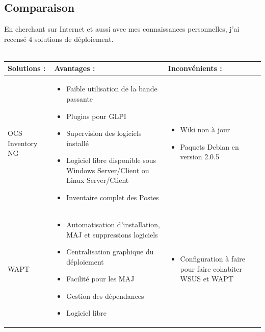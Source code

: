\documentclass[11pt,a4paper,oneside]{article}
\begin{document}
\subsection{Comparaison}
En cherchant sur Internet et aussi avec mes connaissances personnelles, j'ai recensé 4 solutions de déploiement.\\ \\
\begin{tabular}{|p{3.1cm}|p{6.5cm}|p{6.5cm}|}
	\hline
	\centering Solutions : & \centering Avantages : & Inconvénients : \\
	\hline
	\centering OCS Inventory NG  & \begin{itemize}
							\item Faible utilisation de la bande passante 
							\item Plugins pour GLPI							
							\item Supervision des logiciels installé
							\item Logiciel libre disponible sous Windows Server/Client ou Linux Server/Client
							\item Inventaire complet des Postes							
									\end{itemize} & \begin{itemize}
												\item Wiki non à jour  
												\item Paquets Debian en version 2.0.5
										\end{itemize} \\
	\hline
	\centering WAPT  & \begin{itemize}
							\item Automatisation d'installation, MAJ et suppressions logiciels 
							\item Centralisation graphique du déploiement
							\item Facilité pour les MAJ 
							\item Gestion des dépendances
							\item Logiciel libre													
						\end{itemize} & \begin{itemize}
												\item Configuration à faire pour faire cohabiter WSUS et WAPT 

\end{itemize}
\end{tabular}
\end{document}
